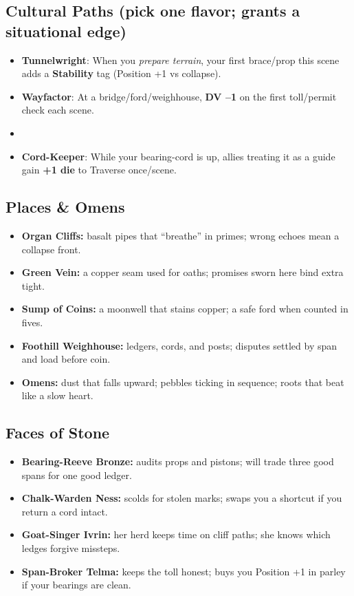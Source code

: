 \documentclass[11pt]{book}
\begin{document}
\subsection*{Cultural Paths (pick one flavor; grants a situational edge)}
\begin{itemize}
    \item \textbf{Tunnelwright}: When you \emph{prepare terrain}, your first brace/prop this scene adds a \textbf{Stability} tag (Position +1 vs collapse).
    \item \textbf{Wayfactor}: At a bridge/ford/weighhouse, \textbf{DV --1} on the first toll/permit check each scene.
    \item \item \textbf{Cord-Keeper}: While your bearing-cord is up, allies treating it as a guide gain \textbf{+1 die} to Traverse once/scene.
\end{itemize}

\subsection*{Places \& Omens}
\begin{itemize}
    \item \textbf{Organ Cliffs:} basalt pipes that ``breathe'' in primes; wrong echoes mean a collapse front.
    \item \textbf{Green Vein:} a copper seam used for oaths; promises sworn here bind extra tight.
    \item \textbf{Sump of Coins:} a moonwell that stains copper; a safe ford when counted in fives.
    \item \textbf{Foothill Weighhouse:} ledgers, cords, and posts; disputes settled by span and load before coin.
    \item \textbf{Omens:} dust that falls upward; pebbles ticking in sequence; roots that beat like a slow heart.
\end{itemize}

\subsection*{Faces of Stone}
\begin{itemize}
    \item \textbf{Bearing-Reeve Bronze:} audits props and pistons; will trade three good spans for one good ledger.
    \item \textbf{Chalk-Warden Ness:} scolds for stolen marks; swaps you a shortcut if you return a cord intact.
    \item \textbf{Goat-Singer Ivrin:} her herd keeps time on cliff paths; she knows which ledges forgive missteps.
    \item \textbf{Span-Broker Telma:} keeps the toll honest; buys you Position +1 in parley if your bearings are clean.
\end{itemize}
\end{document}
